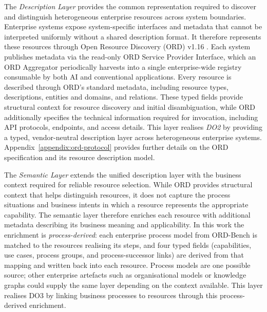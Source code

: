 \documentclass[10pt,twocolumn]{article}
\begin{document}
The \emph{Description Layer} provides the common representation required to discover and distinguish heterogeneous enterprise resources across system boundaries. Enterprise systems expose system-specific interfaces and metadata that cannot be interpreted uniformly without a shared description format. It therefore represents these resources through Open Resource Discovery (ORD) v1.16 \citep{linux_foundation_europe_open_nodate}. Each system publishes metadata via the read-only ORD Service Provider Interface, which an ORD Aggregator periodically harvests into a single enterprise-wide registry consumable by both AI and conventional applications. Every resource is described through ORD's standard metadata, including resource types, descriptions, entities and domains, and relations. These typed fields provide structural context for resource discovery and initial disambiguation, while ORD additionally specifies the technical information required for invocation, including API protocols, endpoints, and access details. This layer realises \textit{DO2} by providing a typed, vendor-neutral description layer across heterogeneous enterprise systems. Appendix~\ref{appendix:ord-protocol} provides further details on the ORD specification and its resource description model.

The \emph{Semantic Layer} extends the unified description layer with the business context required for reliable resource selection. While ORD provides structural context that helps distinguish resources, it does not capture the process situations and business intents in which a resource represents the appropriate capability. The semantic layer therefore enriches each resource with additional metadata describing its business meaning and applicability. In this work the enrichment is \emph{process-derived}: each enterprise process model from ORD-Bench is matched to the resources realising its steps, and four typed fields (capabilities, use cases, process groups, and process-successor links) are derived from that mapping and written back into each resource. Process models are one possible source; other enterprise artefacts such as organisational models or knowledge graphs could supply the same layer depending on the context available. This layer realises DO3 by linking business processes to resources through this process-derived enrichment.
\end{document}
